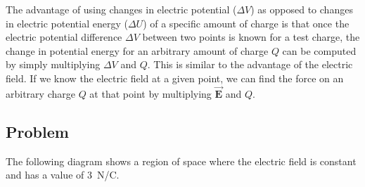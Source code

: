 \documentclass{article}
\newcommand{\bfvec}[1]{\vec{\mathbf{#1}}}
\begin{document}
The advantage of using changes in electric potential ($\Delta V$) as opposed to changes in electric potential energy ($\Delta U$) of a specific amount of charge is that once the electric potential difference $\Delta V$ between two points is known for a test charge, the change in potential energy for an arbitrary amount of charge $Q$ can be computed by simply multiplying $\Delta V$ and $Q$. This is similar to the advantage of the electric field. If we know the electric field at a given point, we can find the force on an arbitrary charge $Q$ at that point by multiplying $\bfvec{E}$ and $Q$.

\subsection{Problem}

The following diagram shows a region of space where the electric field is constant and has a value of $3$ N/C. 


\end{document}

